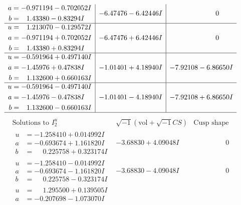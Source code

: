 \documentclass[1p]{elsarticle_modified}
\theoremstyle{definition}
\newcommand{\I}{\sqrt{-1}}
\begin{document}
$$\begin{array}{c|c|c}
\begin{aligned}
a &= -0.971194 - 0.702052 I \\
b &= \phantom{-}1.43380 - 0.83294 I\end{aligned}
 & -6.47476 - 6.42446 I & \phantom{-0.000000 } 0 \\ \hline\begin{aligned}
u &= \phantom{-}1.213070 - 0.129572 I \\
a &= -0.971194 + 0.702052 I \\
b &= \phantom{-}1.43380 + 0.83294 I\end{aligned}
 & -6.47476 + 6.42446 I & \phantom{-0.000000 } 0 \\ \hline\begin{aligned}
u &= -0.591964 + 0.497140 I \\
a &= -1.45976 + 0.47838 I \\
b &= \phantom{-}1.132600 + 0.660163 I\end{aligned}
 & -1.01401 + 4.18940 I & -7.92108 - 6.86650 I \\ \hline\begin{aligned}
u &= -0.591964 - 0.497140 I \\
a &= -1.45976 - 0.47838 I \\
b &= \phantom{-}1.132600 - 0.660163 I\end{aligned}
 & -1.01401 - 4.18940 I & -7.92108 + 6.86650 I\\
 \hline 
 \end{array}$$\newpage$$\begin{array}{c|c|c}  
\text{Solutions to }I^u_{2}& \I (\text{vol} + \sqrt{-1}CS) & \text{Cusp shape}\\
 \hline 
\begin{aligned}
u &= -1.258410 + 0.014992 I \\
a &= -0.693674 + 1.161820 I \\
b &= \phantom{-}0.225758 + 0.323174 I\end{aligned}
 & -3.68830 + 4.09048 I & \phantom{-0.000000 } 0 \\ \hline\begin{aligned}
u &= -1.258410 - 0.014992 I \\
a &= -0.693674 - 1.161820 I \\
b &= \phantom{-}0.225758 - 0.323174 I\end{aligned}
 & -3.68830 - 4.09048 I & \phantom{-0.000000 } 0 \\ \hline\begin{aligned}
u &= \phantom{-}1.295500 + 0.139505 I \\
a &= -0.207698 - 1.073070 I \\

\end{aligned}
\end{array}$$
\end{document}
